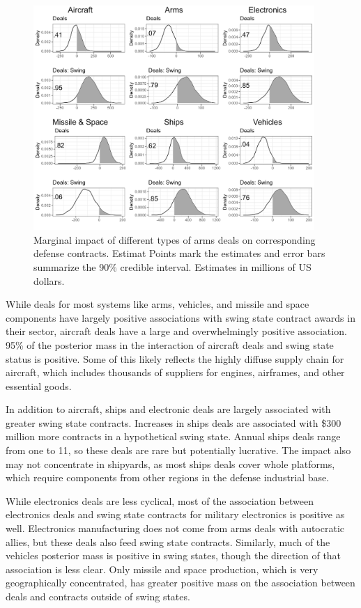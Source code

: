 \documentclass[12pt]{article}
\begin{document}
\begin{figure}[htpb]
	\centering
		\includegraphics[width=0.95\textwidth]{../figures/me-deals-sector.png}
	\caption{Marginal impact of different types of arms deals on corresponding defense contracts. Estimat Points mark the estimates and error bars summarize the 90\% credible interval. Estimates in millions of US dollars.}
	\label{fig:me-deals-sector}
\end{figure}


While deals for most systems like arms, vehicles, and missile and space components have largely positive associations with swing state contract awards in their sector, aircraft deals have a large and overwhelmingly positive association. 
95\% of the posterior mass in the interaction of aircraft deals and swing state status is positive.
Some of this likely reflects the highly diffuse supply chain for aircraft, which includes thousands of suppliers for engines, airframes, and other essential goods. 


In addition to aircraft, ships and electronic deals are largely associated with greater swing state contracts. 
Increases in ships deals are associated with \$300 million more contracts in a hypothetical swing state. 
Annual ships deals range from one to 11, so these deals are rare but potentially lucrative. 
The impact also may not concentrate in shipyards, as most ships deals cover whole platforms, which require components from other regions in the defense industrial base. 

 
While electronics deals are less cyclical, most of the association between electronics deals and swing state contracts for military electronics is positive as well.
Electronics manufacturing does not come from arms deals with autocratic allies, but these deals also feed swing state contracts. 
Similarly, much of the vehicles posterior mass is positive in swing states, though the direction of that association is less clear. 
Only missile and space production, which is very geographically concentrated, has greater positive mass on the association between deals and contracts outside of swing states.
\end{document}
